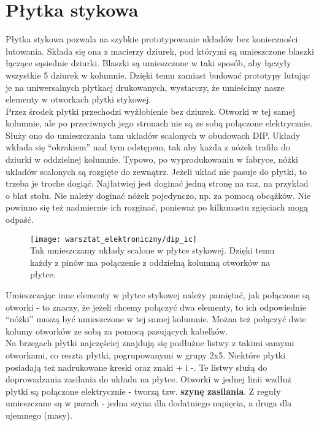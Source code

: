 \documentclass{pdfBooklets}
\begin{document}


\section{Płytka stykowa}
Płytka stykowa pozwala na szybkie prototypowanie układów bez konieczności lutowania. Składa się ona z macierzy dziurek,
pod którymi są umieszczone blaszki łączące sąsiednie dziurki. Blaszki są umieszczone w taki sposób, aby łączyły wszystkie
5 dziurek w kolumnie. Dzięki temu zamiast budować prototypy lutując je na uniwersalnych płytkacj drukowanych, wystarczy, że
umieścimy nasze elementy w otworkach płytki stykowej. 
\\

Przez środek płytki przechodzi wyżłobienie bez dziurek. Otworki w tej samej kolumnie, ale po przeciwnych jego
stronach nie są ze sobą połączone elektrycznie. Służy ono do umieszczania tam układów scalonych w obudowach DIP.
Układy wkłada się ``okrakiem'' nad tym odstępem, tak aby każda z nóżek trafiła do dziurki w oddzielnej kolumnie.
Typowo, po wyprodukowaniu w fabryce, nóżki układów scalonych są rozgięte do zewnątrz. Jeżeli układ nie pasuje do płytki,
to trzeba je troche dogiąć.
Najłatwiej jest doginać jedną stronę na raz, na przykład o blat stołu. Nie należy doginać nóżek pojedynczo, np. za pomocą obcążków.
Nie powinno się też nadmiernie ich rozginać, ponieważ po kilkunastu zgięciach mogą odpaść.
\\

\begin{figure}[h!]\begin{Ramka}{}\begin{center}
  \noindent\texttt{[image: warsztat\_elektroniczny/dip\_ic]}\\
  Tak umieszczamy układy scalone w płytce stykowej. Dzięki temu każdy z pinów ma połączenie z oddzielną kolumną otworków na płytce.
\end{center}\end{Ramka}\end{figure}

Umieszczając inne elementy w płytce stykowej należy pamiętać, jak połączone są otworki - to znaczy, że jeżeli chcemy
połączyć dwa elementy, to ich odpowiednie ``nóżki'' muszą być umieszczone w tej samej kolumnie. Można też połączyć dwie kolumy otworków
ze sobą za pomocą pasujących kabelków.
\\

Na brzegach płytki najczęściej znajdują się podłużne listwy z takimi samymi otworkami, co reszta płytki, pogrupowanymi w grupy 2x5.
Niektóre płytki posiadają też nadrukowane kreski oraz znaki + i -. Te listwy służą do doprowadzania
zasilania do układu na płytce. Otworki w jednej linii wzdłuż płytki są połączone elektrycznie - tworzą tzw.
\textbf{szynę zasilania}. Z reguły umieszczane są w parach - jedna szyna dla dodatniego napięcia, a druga dla ujemnego (masy).\\
\end{document}
